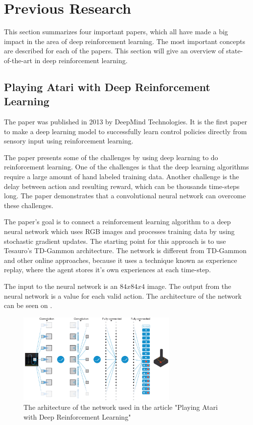 \section{Previous Research}
\label{Previous_Research}
This section summarizes four important papers, which all have made a big impact in the area of deep reinforcement learning. The most important concepts are described for each of the papers. This section will give an overview of state-of-the-art in deep reinforcement learning.    

\subsection{Playing Atari with Deep Reinforcement Learning }
The paper \cite{DBLP:journals/corr/MnihKSGAWR13} was published in 2013 by DeepMind Technologies. It is the first paper to make a deep learning model to successfully learn control policies directly from sensory input using reinforcement learning. 

The paper presents some of the challenges by using deep learning to do reinforcement learning. One of the challenges is that the deep learning algorithms require a large amount of hand labeled training data. Another challenge is the delay between action and resulting reward, which can be thousands time-steps long. The paper demonstrates that a convolutional neural network can overcome these challenges.  

The paper's goal is to connect a reinforcement learning algorithm to a deep neural network which uses RGB images and processes training data by using stochastic gradient updates. The starting point for this approach is to use Tesauro's TD-Gammon \cite{Tesauro:1995:TDL:203330.203343} architecture. The network is different from TD-Gammon and other online approaches, because it uses a technique known as experience replay, where the agent stores it's own experiences at each time-step.

The input to the neural network is an $84 x 84 x 4$ image. The output from the neural network is a value for each valid action. The architecture of the network can be seen on .    
\begin{figure}[H]
	\centering
	\includegraphics[width=0.7\textwidth]{Figures/TheoreticalBackground/playing_atari.jpg}
	\caption{The arhitecture of the network used in the article "Playing Atari with Deep Reinforcement Learning"}
	\label{fig:playing_atari}
\end{figure} 

